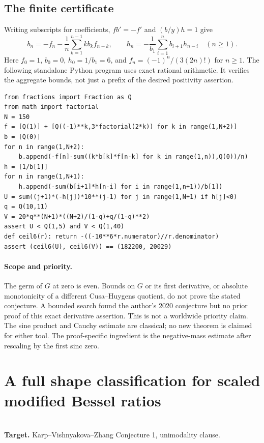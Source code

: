\documentclass[11pt,a4paper]{article}
\begin{document}
\subsection{The finite certificate}
Writing subscripts for coefficients, $fb'=-f'$ and $(b/y)h=1$ give
\[
 b_n=-f_n-\frac1n\sum_{k=1}^{n-1} k b_k f_{n-k},
 \qquad h_n=-\frac1{b_1}\sum_{i=1}^n b_{i+1}h_{n-i}\quad(n\ge1).
\]
Here $f_0=1$, $b_0=0$, $h_0=1/b_1=6$, and $f_n=(-1)^n/(3(2n)!)$ for $n\ge1$. The following standalone Python program uses exact rational arithmetic. It verifies the aggregate bounds, not just a prefix of the desired positivity assertion.
\begin{Verbatim}[fontsize=\footnotesize,breaklines,breakanywhere]
from fractions import Fraction as Q
from math import factorial
N = 150
f = [Q(1)] + [Q((-1)**k,3*factorial(2*k)) for k in range(1,N+2)]
b = [Q(0)]
for n in range(1,N+2):
    b.append(-f[n]-sum((k*b[k]*f[n-k] for k in range(1,n)),Q(0))/n)
h = [1/b[1]]
for n in range(1,N+1):
    h.append(-sum(b[i+1]*h[n-i] for i in range(1,n+1))/b[1])
U = sum((j+1)*(-h[j])*10**(j-1) for j in range(1,N+1) if h[j]<0)
q = Q(10,11)
V = 20*q**(N+1)*((N+2)/(1-q)+q/(1-q)**2)
assert U < Q(1,5) and V < Q(1,40)
def ceil6(r): return -((-10**6*r.numerator)//r.denominator)
assert (ceil6(U), ceil6(V)) == (182200, 20029)
\end{Verbatim}

\paragraph{Scope and priority.}
The germ of $G$ at zero is even. Bounds on $G$ or its first derivative, or absolute monotonicity of a different Cusa--Huygens quotient, do not prove the stated conjecture. A bounded search found the author's 2020 conjecture but no prior proof of this exact derivative assertion. This is not a worldwide priority claim. The sine product and Cauchy estimate are classical; no new theorem is claimed for either tool. The proof-specific ingredient is the negative-mass estimate after rescaling by the first sinc zero.
\endgroup


\clearpage

\section{A full shape classification for scaled modified Bessel ratios}
\label{section:R24Hb}
\\[3pt]
\noindent\textbf{Target.} Karp--Vishnyakova--Zhang Conjecture 1, unimodality clause.
\end{document}
